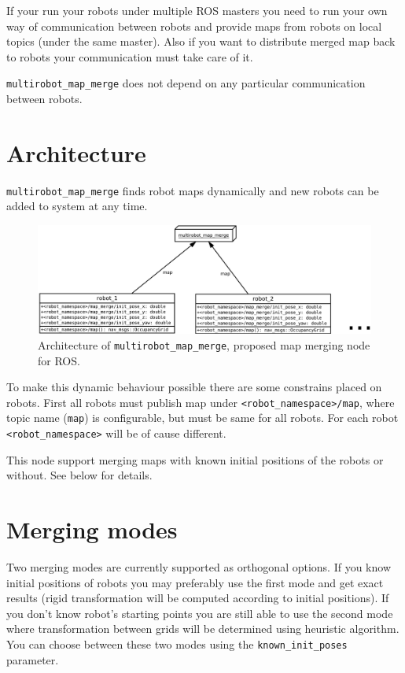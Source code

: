 If your run your robots under multiple ROS masters you need to run your own way of communication between robots and provide maps from robots on local topics (under the same master). Also if you want to distribute merged map back to robots your communication must take care of it.


\texttt{multirobot\_map\_merge} does not depend on any particular communication between robots.

\section{Architecture}

\texttt{multirobot\_map\_merge} finds robot maps dynamically and new robots can be added to system at any time.

\begin{figure}
    \centering
    \includegraphics[width=\textwidth]{../img/map_merge_architecture.pdf}
    \caption{Architecture of \texttt{multirobot\_map\_merge}, proposed map merging node for \gls{ROS}.}
    \label{fig:mapmergearchitecture}
\end{figure}

To make this dynamic behaviour possible there are some constrains placed on robots. First all robots must publish map under \texttt{<robot\_namespace>/map}, where topic name (\texttt{map}) is configurable, but must be same for all robots. For each robot \texttt{<robot\_namespace>} will be of cause different.

This node support merging maps with known initial positions of the robots or without. See below for details.

\section{Merging modes}
\label{sec:mergingmodes}

Two merging modes are currently supported as orthogonal options. If you know initial positions of robots you may preferably use the first mode and get exact results (rigid transformation will be computed according to initial positions). If you don't know robot's starting points you are still able to use the second mode where transformation between grids will be determined using heuristic algorithm. You can choose between these two modes using the \texttt{known\_init\_poses} parameter.

